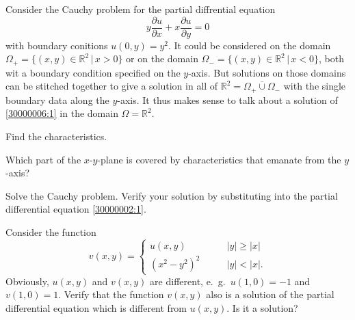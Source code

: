 Consider the Cauchy problem for the partial diffrential equation
\begin{equation}
y\frac{\partial u}{\partial x}+x\frac{\partial u}{\partial y}=0
\label{30000002:1}
\end{equation}
with boundary conitions $u(0,y)=y^2$.
It could be considered on the domain
$\Omega_+=\{ (x,y)\in\mathbb R^2\,|\, x > 0\}$
or on the domain
$\Omega_-=\{(x,y)\in\mathbb R^2\,|\, x <0\}$,
both wit a boundary condition specified on the $y$-axis.
But solutions on those domains can be stitched together to give a solution
in all of $\mathbb R^2=\overline{\Omega_+\cup\Omega_-}$ with the single
boundary data along the $y$-axis.
It thus makes sense to talk about a solution of 
\eqref{30000006:1} in the domain $\Omega=\mathbb R^2$.
\begin{teilaufgaben}
\item
Find the characteristics.
\item
Which part of the $x$-$y$-plane is covered by characteristics that emanate
from the $y$-axis?
\item
Solve the Cauchy problem.
Verify your solution by substituting into the partial differential equation
\eqref{30000002:1}.
\item
Consider the function
\[
v(x,y)=\begin{cases}
u(x,y)&\qquad |y|\ge |x|\\
(x^2-y^2)^2&\qquad |y|<|x|.
\end{cases}
\]
Obviously, $u(x,y)$ and $v(x,y)$ are different, e.~g.~$u(1,0)=-1$
and $v(1,0)=1$.
Verify that the function $v(x,y)$ also is a solution of the partial
differential equation which is different from $u(x,y)$.
Is it a solution?
\end{teilaufgaben}

